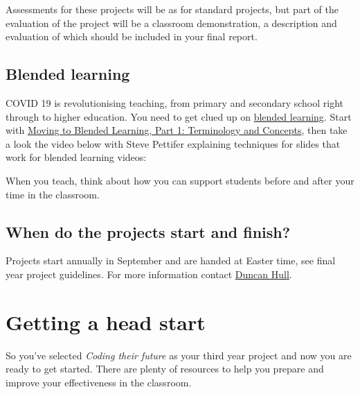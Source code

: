 \documentclass[
  12pt,
]{book}
\begin{document}
Assessments for these projects will be as for standard projects, \citep{COMP30030, COMP30040} but part of the evaluation of the project will be a classroom demonstration, a description and evaluation of which should be included in your final report.

\hypertarget{blended}{%
\subsection{Blended learning}\label{blended}}

COVID 19 is revolutionising teaching, from primary and secondary school right through to higher education. You need to get clued up on \href{https://en.wikipedia.org/wiki/Blended_learning}{blended learning}. Start with \href{http://www.elearning.fse.manchester.ac.uk/fseta/moving-to-blended-learning-part-1-terminology-and-concepts/}{Moving to Blended Learning, Part 1: Terminology and Concepts}, then take a look the video below with Steve Pettifer explaining techniques for slides that work for blended learning videos:

When you teach, think about how you can support students before and after your time in the classroom.

\hypertarget{finishing}{%
\subsection{When do the projects start and finish?}\label{finishing}}

Projects start annually in September and are handed at Easter time, see final year project guidelines. For more information contact \protect\hyperlink{Contact}{Duncan Hull}.

\hypertarget{getting-a-head-start}{%
\section{Getting a head start}\label{getting-a-head-start}}

So you've selected \emph{Coding their future} as your third year project and now you are ready to get started. There are plenty of resources to help you prepare and improve your effectiveness in the classroom.
\end{document}
